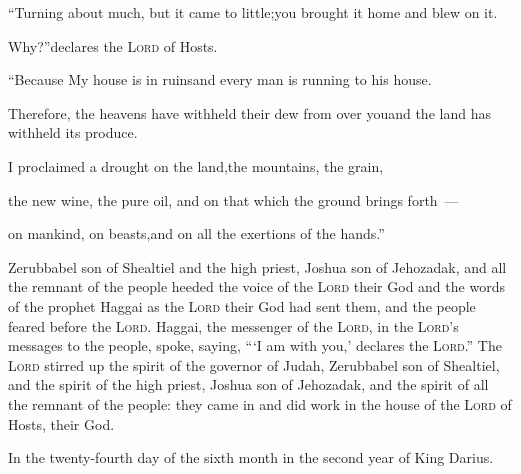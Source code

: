 \begin{inparaenum}
  \pc {} ``Turning about much, but it came to little;\pa you brought it home and blew on it.%
  
  \pd Why?''\pa declares the \textsc{Lord} of Hosts.%
  
  \pd ``Because My house is in ruins\pa and every man is running to his house.%
  
  \pc {} Therefore, the heavens have withheld their dew from over you\pa and the land has withheld its produce.%
  
  \pc {} I proclaimed a drought on the land,\pa the mountains, the grain,%
  
  \pd the new wine,%
  the pure oil,%
  \pa and on%
  that which the ground brings forth~---%
  
  \pd on mankind, on beasts,\pa and on all the exertions of the hands.''\bigskip%
  
   Zerubbabel son of Shealtiel and the high priest, Joshua son of Jehozadak, and all the remnant of the people heeded the voice of the \textsc{Lord} their God and the words of the prophet Haggai as the \textsc{Lord} their God had sent them, and the people feared before the \textsc{Lord}.%
   Haggai, the messenger of the \textsc{Lord}, in the \textsc{Lord}'s messages to the people, spoke, saying,\hspace*{2em} ``\thinspace`I am with you,' declares the \textsc{Lord}.''%
   The \textsc{Lord} stirred up the spirit of the governor of Judah, Zerubbabel son of Shealtiel, and the spirit of the high priest, Joshua son of Jehozadak, and the spirit of all the remnant of the people: they came in and did work in the house of the \textsc{Lord} of Hosts, their God.\smallskip%
  
  \pc {} In the twenty-fourth day of the sixth month in the second year of King Darius.%
\end{inparaenum}
